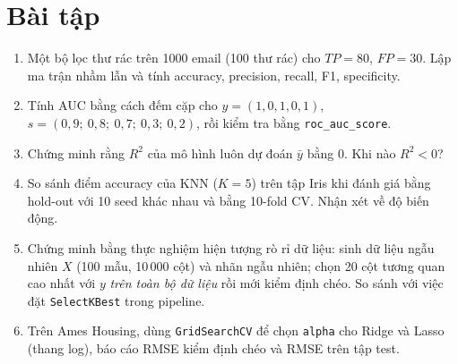 \section{Bài tập}
\begin{enumerate}
    \item Một bộ lọc thư rác trên 1000 email (100 thư rác) cho $TP = 80$, $FP = 30$. Lập ma trận nhầm lẫn và tính accuracy, precision, recall, F1, specificity.
    \item Tính AUC bằng cách đếm cặp cho $y = (1, 0, 1, 0, 1)$, $s = (0{,}9;\ 0{,}8;\ 0{,}7;\ 0{,}3;\ 0{,}2)$, rồi kiểm tra bằng \texttt{roc\_auc\_score}.
    \item Chứng minh rằng $R^2$ của mô hình luôn dự đoán $\bar{y}$ bằng 0. Khi nào $R^2 < 0$?
    \item So sánh điểm accuracy của KNN ($K = 5$) trên tập Iris khi đánh giá bằng hold-out với 10 seed khác nhau và bằng 10-fold CV. Nhận xét về độ biến động.
    \item Chứng minh bằng thực nghiệm hiện tượng rò rỉ dữ liệu: sinh dữ liệu ngẫu nhiên $X$ (100 mẫu, 10\,000 cột) và nhãn ngẫu nhiên; chọn 20 cột tương quan cao nhất với $y$ \textit{trên toàn bộ dữ liệu} rồi mới kiểm định chéo. So sánh với việc đặt \texttt{SelectKBest} trong pipeline.
    \item Trên Ames Housing, dùng \texttt{GridSearchCV} để chọn \texttt{alpha} cho Ridge và Lasso (thang log), báo cáo RMSE kiểm định chéo và RMSE trên tập test.
\end{enumerate}

